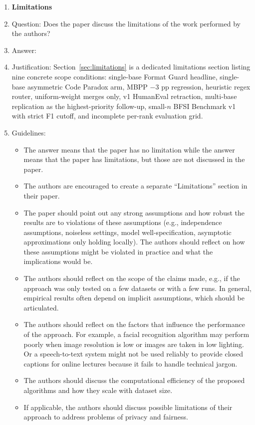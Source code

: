 \begin{enumerate}
\item {\bf Limitations}
    \item[] Question: Does the paper discuss the limitations of the work performed by the authors?
    \item[] Answer: \answerYes{}
    \item[] Justification: Section~\ref{sec:limitations} is a dedicated limitations section listing nine concrete scope conditions: single-base Format Guard headline, single-base asymmetric Code Paradox arm, MBPP $-3$ pp regression, heuristic regex router, uniform-weight merges only, v1 HumanEval retraction, multi-base replication as the highest-priority follow-up, small-$n$ BFSI Benchmark v1 with strict F1 cutoff, and incomplete per-rank evaluation grid.
    \item[] Guidelines:
    \begin{itemize}
        \item The answer \answerNA{} means that the paper has no limitation while the answer \answerNo{} means that the paper has limitations, but those are not discussed in the paper. 
        \item The authors are encouraged to create a separate ``Limitations'' section in their paper.
        \item The paper should point out any strong assumptions and how robust the results are to violations of these assumptions (e.g., independence assumptions, noiseless settings, model well-specification, asymptotic approximations only holding locally). The authors should reflect on how these assumptions might be violated in practice and what the implications would be.
        \item The authors should reflect on the scope of the claims made, e.g., if the approach was only tested on a few datasets or with a few runs. In general, empirical results often depend on implicit assumptions, which should be articulated.
        \item The authors should reflect on the factors that influence the performance of the approach. For example, a facial recognition algorithm may perform poorly when image resolution is low or images are taken in low lighting. Or a speech-to-text system might not be used reliably to provide closed captions for online lectures because it fails to handle technical jargon.
        \item The authors should discuss the computational efficiency of the proposed algorithms and how they scale with dataset size.
        \item If applicable, the authors should discuss possible limitations of their approach to address problems of privacy and fairness.

\end{itemize}
\end{enumerate}
